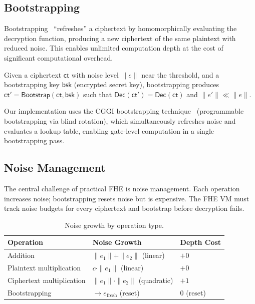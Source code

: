 \subsection{Bootstrapping}

Bootstrapping~\cite{gentry2009fhe} ``refreshes'' a ciphertext by homomorphically
evaluating the decryption function, producing a new ciphertext of the same plaintext
with reduced noise. This enables unlimited computation depth at the cost of
significant computational overhead.

\begin{definition}[Bootstrapping]
Given a ciphertext $\textsf{ct}$ with noise level $\|e\|$ near the threshold, and
a bootstrapping key $\textsf{bsk}$ (encrypted secret key), bootstrapping produces
$\textsf{ct}' = \textsf{Bootstrap}(\textsf{ct}, \textsf{bsk})$ such that
$\textsf{Dec}(\textsf{ct}') = \textsf{Dec}(\textsf{ct})$ and $\|e'\| \ll \|e\|$.
\end{definition}

Our implementation uses the CGGI bootstrapping technique~\cite{cggi2020tfhe}
(programmable bootstrapping via blind rotation), which simultaneously refreshes
noise and evaluates a lookup table, enabling gate-level computation in a single
bootstrapping pass.

\subsection{Noise Management}

The central challenge of practical FHE is noise management. Each operation increases
noise; bootstrapping resets noise but is expensive. The FHE VM must track noise
budgets for every ciphertext and bootstrap before decryption fails.

\begin{table}[ht]
\centering
\caption{Noise growth by operation type.}
\label{tab:noise-growth}
\begin{tabular}{lll}
\toprule
\textbf{Operation} & \textbf{Noise Growth} & \textbf{Depth Cost} \\
\midrule
Addition & $\|e_1\| + \|e_2\|$ (linear) & $+0$ \\
Plaintext multiplication & $c \cdot \|e_1\|$ (linear) & $+0$ \\
Ciphertext multiplication & $\|e_1\| \cdot \|e_2\|$ (quadratic) & $+1$ \\
Bootstrapping & $\to e_{\text{fresh}}$ (reset) & $0$ (reset) \\
\bottomrule
\end{tabular}
\end{table}

